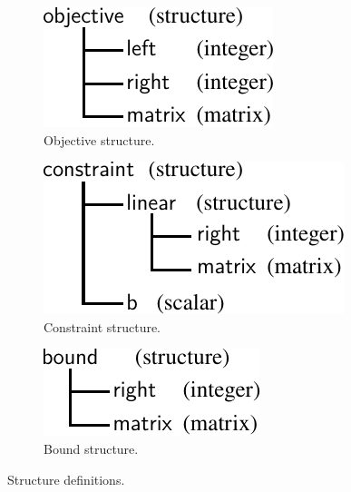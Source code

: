 
\begin{figure}%
\centering

\begin{subfigure}{0.3\textwidth}
\centering
\includegraphics[scale=0.8]{../ch5/figures/objective}
\caption{Objective structure.}
\label{fig:struct:objective}
\end{subfigure}%
\begin{subfigure}{0.3\textwidth}
\centering
\includegraphics[scale=0.8]{../ch5/figures/constraint}
\caption{Constraint structure.}
\label{fig:struct:constraint}
\end{subfigure}%
\begin{subfigure}{0.3\textwidth}
\centering
\includegraphics[scale=0.8]{../ch5/figures/bound}
\caption{Bound structure.}
\label{fig:struct:bound}
\end{subfigure}%

\caption{Structure definitions.}
\label{fig:struct}
\end{figure}